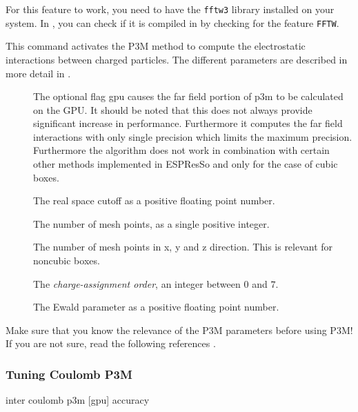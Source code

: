 For this feature to work, you need to have the \texttt{fftw3} library
installed on your system. In \es{}, you can check if it is compiled in
by checking for the feature \texttt{FFTW}.

This command activates the P3M method to compute the electrostatic
interactions between charged particles.  The different parameters are
described in more detail in \cite{deserno98a}.
\begin{description}
\item[\var{[gpu]}]
The optional flag gpu causes the far field portion of p3m to be calculated on the GPU.  It should be noted that this does not always provide significant increase in performance.  Furthermore it computes the far field interactions with only single precision which limits the maximum precision.  Furthermore the algorithm does not work in combination with certain other methods implemented in ESPResSo and only for the case of cubic boxes.
\item[] The real space cutoff as a positive
  floating point number.
\item[] The number of mesh points, as a single positive
  integer.
\item[] The number of mesh points in x, y and z
  direction. This is relevant for noncubic boxes.
\item[] The \emph{charge-assignment order}, an integer
  between $0$ and $7$.
\item[] The Ewald parameter as a positive floating point
  number.
\end{description}

Make sure that you know the relevance of the P3M parameters before
using P3M! If you are not sure, read the following references
\cite{ewald21, hockney88, kolafa92, deserno98, deserno98a, deserno00,
  deserno00a, cerda08a}.


\subsubsection{Tuning Coulomb P3M}
\label{ssec:tunep3m}
\begin{essyntax}
  inter coulomb  p3m  [gpu]
  accuracy \\
  \begin{features}
  \end{features}
\end{essyntax}

